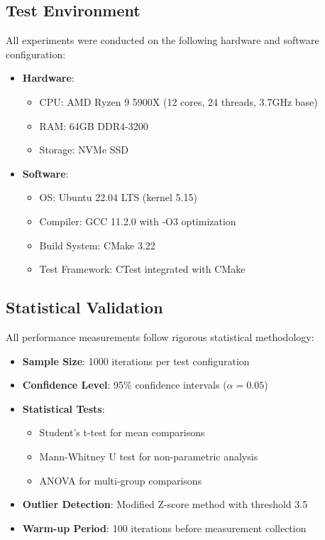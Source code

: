 \documentclass[11pt,a4paper]{article}
\begin{document}
\subsection{Test Environment}

All experiments were conducted on the following hardware and software configuration:

\begin{itemize}
\item \textbf{Hardware}: 
  \begin{itemize}
  \item CPU: AMD Ryzen 9 5900X (12 cores, 24 threads, 3.7GHz base)
  \item RAM: 64GB DDR4-3200
  \item Storage: NVMe SSD
  \end{itemize}
\item \textbf{Software}:
  \begin{itemize}
  \item OS: Ubuntu 22.04 LTS (kernel 5.15)
  \item Compiler: GCC 11.2.0 with -O3 optimization
  \item Build System: CMake 3.22
  \item Test Framework: CTest integrated with CMake
  \end{itemize}
\end{itemize}

\subsection{Statistical Validation}

All performance measurements follow rigorous statistical methodology:

\begin{itemize}
\item \textbf{Sample Size}: 1000 iterations per test configuration
\item \textbf{Confidence Level}: 95\% confidence intervals ($\alpha = 0.05$)
\item \textbf{Statistical Tests}: 
  \begin{itemize}
  \item Student's t-test for mean comparisons
  \item Mann-Whitney U test for non-parametric analysis
  \item ANOVA for multi-group comparisons
  \end{itemize}
\item \textbf{Outlier Detection}: Modified Z-score method with threshold 3.5
\item \textbf{Warm-up Period}: 100 iterations before measurement collection
\end{itemize}
\end{document}
